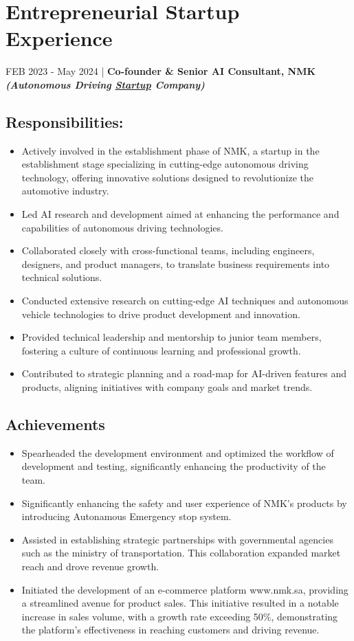 \documentclass[letterpaper,
		10pt]{article}
\begin{document}
\section{Entrepreneurial Startup Experience}
FEB 2023 - May 2024 | \textbf{Co-founder \& Senior AI Consultant, NMK} \textit{\textbf{ (Autonomous Driving \underline{Startup} Company)}}
\subsection{Responsibilities:}
\begin{itemize}
\item Actively involved in the establishment phase of NMK, a startup in the establishment stage specializing in cutting-edge autonomous driving technology, offering innovative solutions designed to revolutionize the automotive industry. 
\item Led AI research and development aimed at enhancing the performance and capabilities of autonomous driving technologies.
\item Collaborated closely with cross-functional teams, including engineers, designers, and product managers, to translate business requirements into technical solutions.
\item Conducted extensive research on cutting-edge AI techniques and autonomous vehicle technologies to drive product development and innovation.
\item Provided technical leadership and mentorship to junior team members, fostering a culture of continuous learning and professional growth.
\item Contributed to strategic planning and a road-map for AI-driven features and products, aligning initiatives with company goals and market trends.     
\end{itemize}

\subsection{Achievements}
\begin{itemize}
\item Spearheaded the development environment and optimized the workflow of development and testing, significantly enhancing the productivity of the team.
\item Significantly enhancing the safety and user experience of NMK's products by introducing Autonamous Emergency stop system. 
\item Assisted in establishing strategic partnerships with governmental agencies such as the ministry of transportation. This collaboration expanded market reach and drove revenue growth.
\item Initiated the development of an e-commerce platform www.nmk.sa, providing a streamlined avenue for product sales. This initiative resulted in a notable increase in sales volume, with a growth rate exceeding 50\%, demonstrating the platform's effectiveness in reaching customers and driving revenue.
\end{itemize}
\end{document}
